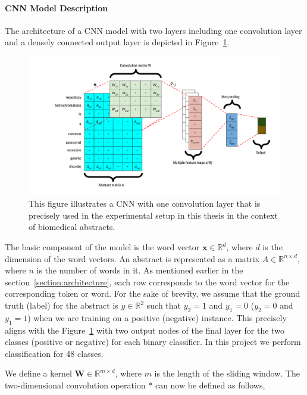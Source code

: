 \paragraph{CNN Model Description}
The architecture of a CNN model with two layers including one convolution layer and a densely connected output layer is depicted in Figure~\ref{fig:Cnn_one_layer}.
\begin{figure}[!htb]
    \includegraphics[width=1\textwidth,left]{Figures/cnn-model-example.png}
    \caption{This figure illustrates a CNN with one convolution layer that is precisely used in the experimental setup in this thesis in the context of biomedical abstracts.}
    \label{fig:Cnn_one_layer}
\end{figure}
The basic component of the model is the word vector $\mathbf{x} \in \mathbb{R}^d$, where $d$ is the dimension of the word vectors. An abstract is represented as a matrix $A \in \mathbb{R}^{n \times d}$, where $n$ is the number of words in it. As mentioned earlier in the section~\ref{section:architecture}, each row corresponds to the word vector for the corresponding token or word. For the sake of brevity, we assume that the ground truth (label) for the abstract is $y \in \mathbb{R}^2$ such that $y_2 = 1$ and $y_1 = 0$ ($y_2 = 0$ and $y_1 = 1$) when we are training on a positive (negative) instance. This precisely aligns with the Figure~\ref{fig:Cnn_one_layer} with two output nodes of the final layer for the two classes (positive or negative) for each binary classifier. In this project we perform classification for 48 classes. 

We define a kernel $\mathbf{W} \in \mathbb{R}^{m \times d}$, where $m$ is the length of the sliding window. The two-dimensional convolution operation $\mathbf{*}$ can now be defined as follows,

